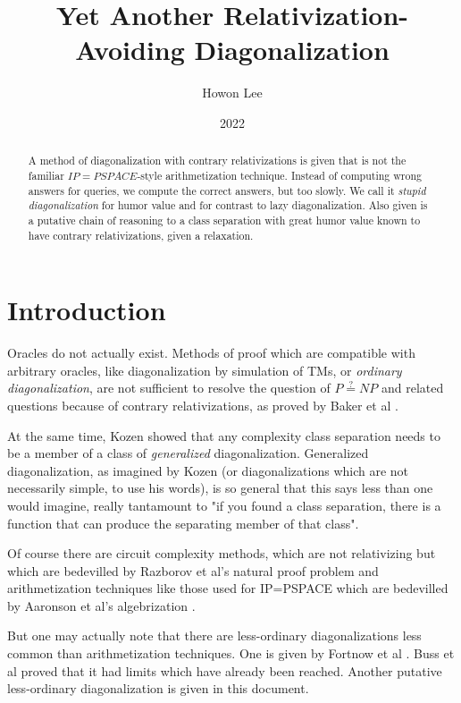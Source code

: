 \documentclass{article}
\title{Yet Another Relativization-Avoiding Diagonalization}
\author{Howon Lee}
\date{2022}
\begin{document}
\maketitle
\begin{abstract}
A method of diagonalization with contrary relativizations is given that is not the familiar $IP=PSPACE$-style arithmetization technique. Instead of computing wrong answers for queries, we compute the correct answers, but too slowly. We call it \textit{stupid diagonalization} for humor value and for contrast to lazy diagonalization. Also given is a putative chain of reasoning to a class separation with great humor value known to have contrary relativizations, given a relaxation.
\end{abstract}

\section{Introduction}

Oracles do not actually exist. Methods of proof which are compatible with arbitrary oracles, like diagonalization by simulation of TMs, or \textit{ordinary diagonalization}, are not sufficient to resolve the question of $P \stackrel{?}{=} NP$ and related questions because of contrary relativizations, as proved by Baker et al \cite{bgs}.

At the same time, Kozen \cite{kozen} showed that any complexity class separation needs to be a member of a class of \textit{generalized} diagonalization. Generalized diagonalization, as imagined by Kozen (or diagonalizations which are not necessarily simple, to use his words), is so general that this says less than one would imagine, really tantamount to "if you found a class separation, there is a function that can produce the separating member of that class".

Of course there are circuit complexity methods, which are not relativizing but which are bedevilled by Razborov et al's natural proof problem \cite{razborov} and arithmetization techniques like those used for IP=PSPACE \cite{ippspace} which are bedevilled by Aaronson et al's algebrization \cite{algebrization}.

But one may actually note that there are less-ordinary diagonalizations less common than arithmetization techniques. One is given by Fortnow et al \cite{fortnowdiag}. Buss et al \cite{buss2015limits} proved that it had limits which have already been reached. Another putative less-ordinary diagonalization is given in this document.
\end{document}
